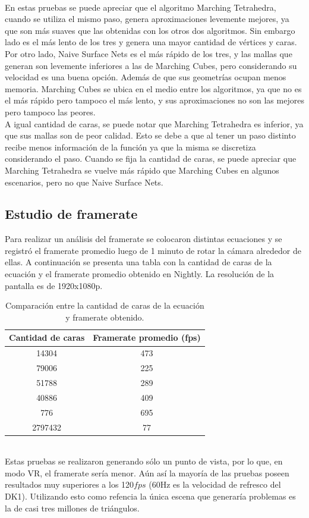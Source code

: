 \documentclass[12pt]{article}
\begin{document}
\\En estas pruebas se puede apreciar que el algoritmo Marching Tetrahedra, cuando se utiliza el mismo paso, genera aproximaciones levemente mejores, ya que son más suaves que las obtenidas con los otros dos algoritmos. Sin embargo lado es el más lento de los tres y genera una mayor cantidad de vértices y caras. Por otro lado, Naive Surface Nets es el más rápido de los tres, y las mallas que generan son levemente inferiores a las de Marching Cubes, pero considerando su velocidad es una buena opción. Además de que sus geometrías ocupan menos memoria. Marching Cubes se ubica en el medio entre los algoritmos, ya que no es el más rápido pero tampoco el más lento, y sus aproximaciones no son las mejores pero tampoco las peores.
\\ A igual cantidad de caras, se puede notar que Marching Tetrahedra es inferior, ya que sus mallas son de peor calidad. Esto se debe a que al tener un paso distinto recibe menos información de la función ya que la misma se discretiza considerando el paso. Cuando se fija la cantidad de caras, se puede apreciar que Marching Tetrahedra se vuelve más rápido que Marching Cubes en algunos escenarios, pero no que Naive Surface Nets.

\subsection{ Estudio de framerate}
Para realizar un análisis del framerate se colocaron distintas ecuaciones y se registró el framerate promedio luego de 1 minuto de rotar la cámara alrededor de ellas. A continuación se presenta una tabla con la cantidad de caras de la ecuación y el framerate promedio obtenido en Nightly. La resolución de la pantalla es de 1920x1080p.
\begin{table}[h!]
  \centering
  \label{tab:table1}
  \begin{tabular}{cc}
    \toprule
    Cantidad de caras & Framerate promedio (fps)\\
    \midrule
    14304 & 473\\
    79006 & 225\\
    51788 & 289\\
    40886&409\\
    776&695\\
    2797432&77\\
    \bottomrule
  \end{tabular}
  \caption{Comparación entre la cantidad de caras de la ecuación y framerate obtenido.}
\end{table}
\\Estas pruebas se realizaron generando sólo un punto de vista, por lo que, en modo VR, el framerate sería menor. Aún así la mayoría de las pruebas poseen resultados muy superiores a los 120$fps$ (60Hz es la velocidad de refresco del DK1). Utilizando esto como refencia la única escena que generaría problemas es la de casi tres millones de triángulos.
\end{document}
